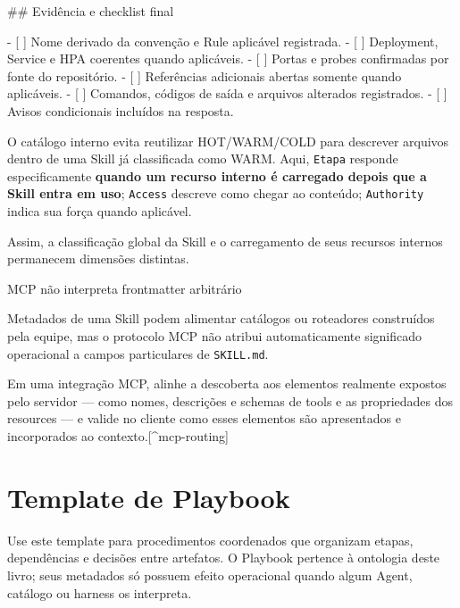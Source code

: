 \documentclass[
  10pt,
  a4paper,
  oneside]{book}
\newenvironment{Shaded}{}{}
\newcommand{\FunctionTok}[1]{\textcolor[rgb]{0.02,0.16,0.49}{#1}}
\newcommand{\NormalTok}[1]{#1}
\newcommand{\SpecialStringTok}[1]{\textcolor[rgb]{0.73,0.40,0.53}{#1}}
\newcommand{\VariableTok}[1]{\textcolor[rgb]{0.10,0.09,0.49}{#1}}
\renewenvironment{Shaded}{\begin{snugshade}}{\end{snugshade}}%
\begin{document}
\begin{Shaded}
\begin{Highlighting}[]
\FunctionTok{\#\# Evidência e checklist final}

\SpecialStringTok{{-} }\VariableTok{[ ]}\NormalTok{ Nome derivado da convenção e Rule aplicável registrada.}
\SpecialStringTok{{-} }\VariableTok{[ ]}\NormalTok{ Deployment, Service e HPA coerentes quando aplicáveis.}
\SpecialStringTok{{-} }\VariableTok{[ ]}\NormalTok{ Portas e probes confirmadas por fonte do repositório.}
\SpecialStringTok{{-} }\VariableTok{[ ]}\NormalTok{ Referências adicionais abertas somente quando aplicáveis.}
\SpecialStringTok{{-} }\VariableTok{[ ]}\NormalTok{ Comandos, códigos de saída e arquivos alterados registrados.}
\SpecialStringTok{{-} }\VariableTok{[ ]}\NormalTok{ Avisos condicionais incluídos na resposta.}
\end{Highlighting}
\end{Shaded}

O catálogo interno evita reutilizar HOT/WARM/COLD para descrever
arquivos dentro de uma Skill já classificada como WARM. Aqui,
\texttt{Etapa} responde especificamente \textbf{quando um recurso
interno é carregado depois que a Skill entra em uso}; \texttt{Access}
descreve como chegar ao conteúdo; \texttt{Authority} indica sua força
quando aplicável.

Assim, a classificação global da Skill e o carregamento de seus recursos
internos permanecem dimensões distintas.

\begin{warningbox}{MCP não interpreta frontmatter arbitrário}

Metadados de uma Skill podem alimentar catálogos ou roteadores
construídos pela equipe, mas o protocolo MCP não atribui automaticamente
significado operacional a campos particulares de \texttt{SKILL.md}.

Em uma integração MCP, alinhe a descoberta aos elementos realmente
expostos pelo servidor --- como nomes, descrições e schemas de tools e
as propriedades dos resources --- e valide no cliente como esses
elementos são apresentados e incorporados ao
contexto.{[}\^{}mcp-routing{]}

\end{warningbox}

\hypertarget{template-de-playbook}{%
\section{Template de Playbook}\label{template-de-playbook}}

Use este template para procedimentos coordenados que organizam etapas,
dependências e decisões entre artefatos. O Playbook pertence à ontologia
deste livro; seus metadados só possuem efeito operacional quando algum
Agent, catálogo ou harness os interpreta.
\end{document}
